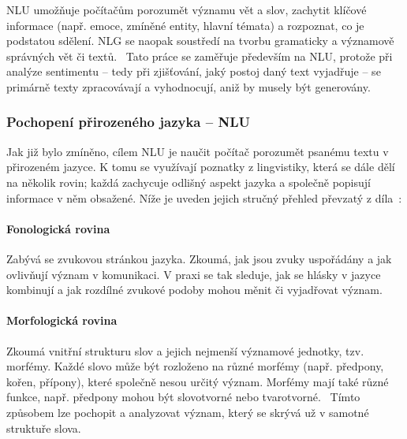 NLU umožňuje počítačům porozumět významu vět a slov, zachytit klíčové informace (např. emoce, zmíněné entity, hlavní témata) a rozpoznat, co je podstatou sdělení. NLG se naopak soustředí na tvorbu gramaticky a významově správných vět či textů.~\cite{Khurana2023} Tato práce se zaměřuje především na NLU, protože při analýze sentimentu -- tedy při zjišťování, jaký postoj daný text vyjadřuje -- se primárně texty zpracovávají a vyhodnocují,
aniž by musely být generovány.

\subsubsection{Pochopení přirozeného jazyka -- NLU}\label{NLU}

Jak již bylo zmíněno, cílem NLU je naučit počítač porozumět psanému textu v přirozeném jazyce. K tomu se využívají poznatky z lingvistiky, která se dále dělí na několik rovin; každá zachycuje odlišný aspekt jazyka a společně popisují informace v něm obsažené. Níže je uveden jejich stručný přehled převzatý z díla~\cite{Khurana2023}:

\paragraph{Fonologická rovina}
Zabývá se zvukovou stránkou jazyka. Zkoumá, jak jsou zvuky uspořádány a jak ovlivňují význam v komunikaci. V praxi se tak sleduje, jak se hlásky v jazyce kombinují a jak rozdílné zvukové podoby mohou měnit či vyjadřovat význam.

\paragraph{Morfologická rovina}
Zkoumá vnitřní strukturu slov a jejich nejmenší významové jednotky, tzv. morfémy. Každé slovo může být rozloženo na různé morfémy (např. předpony, kořen, přípony), které společně nesou určitý význam. Morfémy mají také různé funkce, např. předpony mohou být slovotvorné nebo tvarotvorné.~\cite{ujc-prirucka} Tímto způsobem lze pochopit a analyzovat význam, který se skrývá už v samotné struktuře slova.

